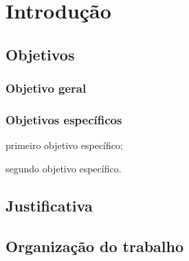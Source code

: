 \chapter{Introdução}\label{sec:introducao}


\section{Objetivos}\label{sec:objetivos}

\subsection{Objetivo geral}


\subsection{Objetivos específicos}

\begin{alineas}
  \item primeiro objetivo específico;
  \item segundo objetivo específico.
\end{alineas}

\section{Justificativa}\label{sec:justificativa}

\section{Organização do trabalho}\label{sec:organizacao}
